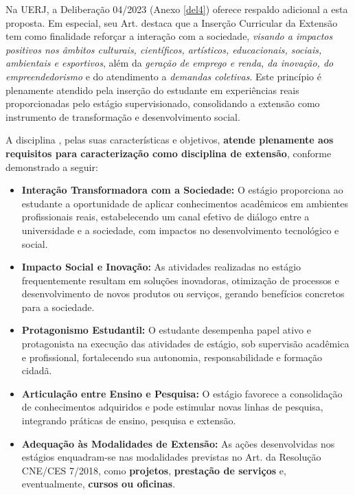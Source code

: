 Na UERJ, a Deliberação  04/2023 (Anexo \ref{del4}) oferece respaldo adicional a esta proposta. Em especial, seu Art.  destaca que a Inserção Curricular da Extensão tem como finalidade reforçar a interação com a sociedade, \textit{visando a impactos positivos nos âmbitos culturais, científicos, artísticos, educacionais, sociais, ambientais e esportivos}, além da \textit{geração de emprego e renda, da inovação, do empreendedorismo} e do atendimento a \textit{demandas coletivas}. Este princípio é plenamente atendido pela inserção do estudante em experiências reais proporcionadas pelo estágio supervisionado, consolidando a extensão como instrumento de transformação e desenvolvimento social.

A disciplina \EstSup, pelas suas características e objetivos, \textbf{atende plenamente aos requisitos para caracterização como disciplina de extensão}, conforme demonstrado a seguir:

\begin{itemize} \item \textbf{Interação Transformadora com a Sociedade:} O estágio proporciona ao estudante a oportunidade de aplicar conhecimentos acadêmicos em ambientes profissionais reais, estabelecendo um canal efetivo de diálogo entre a universidade e a sociedade, com impactos no desenvolvimento tecnológico e social. \item \textbf{Impacto Social e Inovação:} As atividades realizadas no estágio frequentemente resultam em soluções inovadoras, otimização de processos e desenvolvimento de novos produtos ou serviços, gerando benefícios concretos para a sociedade. \item \textbf{Protagonismo Estudantil:} O estudante desempenha papel ativo e protagonista na execução das atividades de estágio, sob supervisão acadêmica e profissional, fortalecendo sua autonomia, responsabilidade e formação cidadã. \item \textbf{Articulação entre Ensino e Pesquisa:} O estágio favorece a consolidação de conhecimentos adquiridos e pode estimular novas linhas de pesquisa, integrando práticas de ensino, pesquisa e extensão. \item \textbf{Adequação às Modalidades de Extensão:} As ações desenvolvidas nos estágios enquadram-se nas modalidades previstas no Art.    da Resolução CNE/CES  7/2018, como \textbf{projetos}, \textbf{prestação de serviços} e, eventualmente, \textbf{cursos ou oficinas}. \end{itemize}

